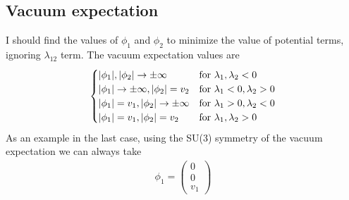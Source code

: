 \subsection{Vacuum expectation}
I should find the values of $\phi_1$ and $\phi_2$ to minimize the value of potential terms, ignoring  $\lambda_{12}$ term. The vacuum expectation values are
\begin{align}\label{8}
    \begin{cases}
        |\phi_1|,|\phi_2|\to\pm\infty&\rm{for}\ \lambda_1,\lambda_2<0\\
        |\phi_1|\to\pm\infty,|\phi_2|=v_2&\rm{for}\ \lambda_1<0,\lambda_2>0\\
        |\phi_1|=v_1,|\phi_2|\to\pm\infty&\rm{for}\ \lambda_1>0,\lambda_2<0\\
        |\phi_1|=v_1,|\phi_2|=v_2&\rm{for}\ \lambda_1,\lambda_2>0
    \end{cases}
\end{align}
As an example in the last case, using the SU(3) symmetry of the vacuum expectation we can always take
\begin{align*}
    \phi_1=\begin{pmatrix}
        0\\0\\v_1
    \end{pmatrix}
\end{align*}

